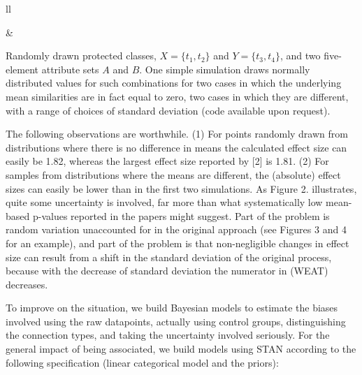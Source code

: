 \documentclass[
  12pt,
  dvipsnames,enabledeprecatedfontcommands]{scrartcl}
\begin{document}
\noindent

\begin{tabular}{ll}
\begin{minipage}[c]{0.35\linewidth}
\end{minipage}& \begin{minipage}[c]{0.6\linewidth}

Randomly drawn protected classes, $X=\{t_1,t_2\}$ and $Y=\{t_3,t_4\}$, and two five-element attribute sets $A$ and $B$. One simple simulation draws normally distributed values for such combinations for two cases in which the underlying mean similarities are in fact equal to zero, two cases in which they are different, with a range of choices of standard deviation  (code available upon request).

\end{minipage}
\end{tabular}

\vspace{1mm}

The following observations are worthwhile. (1) For points randomly drawn
from distributions where there is no difference in means the calculated
effect size can easily be 1.82, whereas the largest effect size reported
by {[}2{]} is 1.81. (2) For samples from distributions where the means
are different, the (absolute) effect sizes can easily be lower than in
the first two simulations. As Figure 2. illustrates, quite some
uncertainty is involved, far more than what systematically low
mean-based p-values reported in the papers might suggest. Part of the
problem is random variation unaccounted for in the original approach
(see Figures 3 and 4 for an example), and part of the problem is that
non-negligible changes in effect size can result from a shift in the
standard deviation of the original process, because with the decrease of
standard deviation the numerator in (WEAT) decreases.

To improve on the situation, we build Bayesian models to estimate the
biases involved using the raw datapoints, actually using control groups,
distinguishing the connection types, and taking the uncertainty involved
seriously. For the general impact of being associated, we build models
using STAN according to the following specification (linear categorical
model and the priors):
\end{document}

